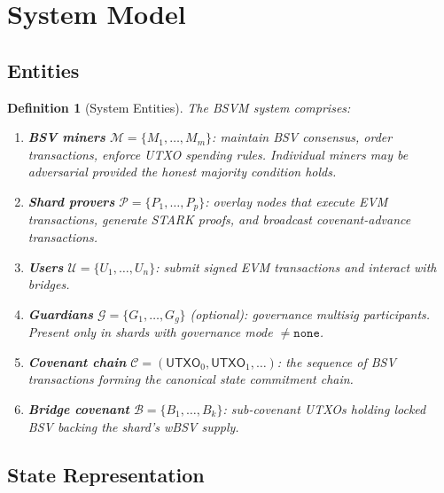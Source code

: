 \documentclass[11pt,a4paper]{article}
\newtheorem{definition}{Definition}[section]
\newcommand{\UTXO}{\mathsf{UTXO}}
\begin{document}
\section{System Model}\label{sec:system}

\subsection{Entities}

\begin{definition}[System Entities]\label{def:entities}
The BSVM system comprises:
\begin{enumerate}[label=(\roman*),nosep]
    \item \textbf{BSV miners} $\mathcal{M} = \{M_1, \ldots, M_m\}$: maintain BSV consensus, order transactions, enforce UTXO spending rules. Individual miners may be adversarial provided the honest majority condition holds.
    \item \textbf{Shard provers} $\mathcal{P} = \{P_1, \ldots, P_p\}$: overlay nodes that execute EVM transactions, generate STARK proofs, and broadcast covenant-advance transactions.
    \item \textbf{Users} $\mathcal{U} = \{U_1, \ldots, U_n\}$: submit signed EVM transactions and interact with bridges.
    \item \textbf{Guardians} $\mathcal{G} = \{G_1, \ldots, G_g\}$ (optional): governance multisig participants. Present only in shards with governance mode $\neq \mathtt{none}$.
    \item \textbf{Covenant chain} $\mathcal{C} = (\UTXO_0, \UTXO_1, \ldots)$: the sequence of BSV transactions forming the canonical state commitment chain.
    \item \textbf{Bridge covenant} $\mathcal{B} = \{B_1, \ldots, B_k\}$: sub-covenant UTXOs holding locked BSV backing the shard's wBSV supply.
\end{enumerate}
\end{definition}

\subsection{State Representation}
\end{document}
